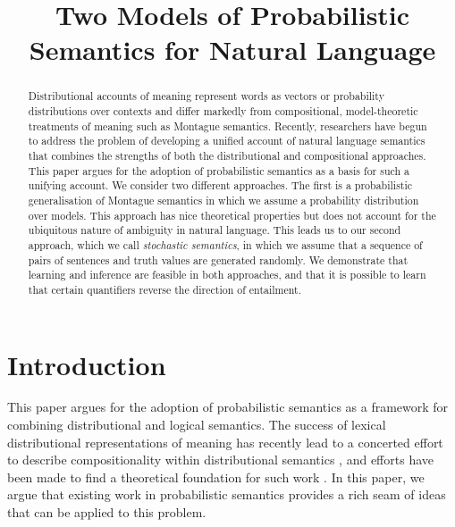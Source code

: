 \documentclass[11pt]{article}
\title{Two Models of Probabilistic Semantics for Natural Language}
\author{}
\date{}
\theoremstyle{definition}
\begin{document}
\maketitle
\begin{abstract}
  Distributional accounts of meaning represent words as vectors or
  probability distributions over contexts and differ markedly from
  compositional, model-theoretic treatments of meaning such as
  Montague semantics. Recently, researchers have begun to address the
  problem of developing a unified account of natural language
  semantics that combines the strengths of both the distributional and
  compositional approaches. This paper argues for the adoption of
  probabilistic semantics as a basis for such a unifying account. We
  consider two different approaches. The first is a probabilistic
  generalisation of Montague semantics in which we assume a
  probability distribution over models. This approach has nice
  theoretical properties but does not account for the ubiquitous
  nature of ambiguity in natural language. This leads us to our second
  approach, which we call \emph{stochastic semantics}, in which we
  assume that a sequence of pairs of sentences and truth values are
  generated randomly. We demonstrate that learning and inference are
  feasible in both approaches, and that it is possible to learn that
  certain quantifiers reverse the direction of entailment.
\end{abstract}


\section{Introduction}

This paper argues for the adoption of probabilistic semantics as a
framework for combining distributional and logical semantics. The
success of lexical distributional representations of meaning has
recently lead to a concerted effort to describe compositionality
within distributional semantics
\cite{Widdows:08,Mitchell:08,Baroni2010,Garrette:11,Grefenstette:11,Socher:12,Lewis:13},
and efforts have been made to find a theoretical foundation for such
work \cite{Clarke:12,Kartsaklis:14}. In this paper, we argue that
existing work in probabilistic semantics
\cite{Gaifman:64,Nilsson:86,Sato:95} provides a rich seam of ideas
that can be applied to this problem.
\end{document}
